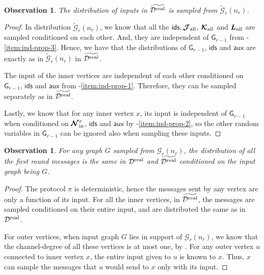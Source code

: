 \documentclass[11pt]{article}
\newtheorem{observation}[lemma]{Observation}
\theoremstyle{definition}
\newcommand{\rv}[1]{\ensuremath{{\mathsf{#1}}}\xspace}
\newcommand{\prot}{\ensuremath{\pi}}
\newcommand{\rNinner}[2]{\ensuremath{\bm{\mathcal{N}}_{\textnormal{in}}^{#1_{#2}}}}
\newcommand{\cD}{\ensuremath{\mathcal{D}}}
\newcommand{\cG}{\ensuremath{\mathcal{G}}}
\newcommand{\cGtil}{\ensuremath{\widetilde{\cG}}}
\newcommand{\cDreal}{\ensuremath{\cD^{\textnormal{real}}}}
\newcommand{\cDrealtil}{\ensuremath{\widetilde{\cDreal}}}
\newcommand{\raux}{\ensuremath{\rv{aux}}}
\newcommand{\rcJall}{\ensuremath{\bm{\mathcal{J}}_{\textnormal{all}}}}
\newcommand{\rcKall}{\ensuremath{\bm{\mathcal{K}}_{\textnormal{all}}}}
\newcommand{\rLall}{\ensuremath{\bm{L}_{\textnormal{all}}}}
\newcommand{\rG}{\ensuremath{\rv{G}}}
\newcommand{\rids}{\ensuremath{\rv{ids}}}
\newcommand{\rmsgall}{\ensuremath{\bm{\mathcal{M}}_{\textnormal{all}}}}
\begin{document}
\begin{observation}\label{obs:cDrealtil-input-same}
The distribution of inputs in $\cDrealtil$ is sampled from $\cGtil_r(n_r)$.
\end{observation}
\begin{proof}
	In distribution $\cGtil_r(n_r)$, we know that all the $\rids, \rcJall$, $\rcKall $ and $\rLall$ are sampled conditioned on each other. And, they are independent of $\rG_{r-1}$ from -\ref{item:ind-prop-3}. Hence, we have that the distributions of $\rG_{r-1}$, $\rids$ and $\raux$ are exactly as in $\cGtil_r(n_r)$ in $\cDrealtil$.
	
	The input of the inner vertices are independent of each other conditioned on $\rG_{r-1}$, $\rids$ and $\raux$ from -\ref{item:ind-prop-1}. Therefore, they can be sampled separately as in $\cDrealtil$.
	
	Lastly, we know that for any inner vertex $x$, its input is independent of $\rG_{r-1}$ when conditioned on $\rNinner{x}{}$, $\rids$ and $\raux$ by -\ref{item:ind-prop-2}, so the other random variables in $\rG_{r-1}$ can be ignored also when sampling these inputs. 
\end{proof}

\begin{observation}\label{obs:cDrealtil-messages}
	For any graph $G$ sampled from $\cG_r(n_r)$, the distribution of all the first round messages is the same in $\cDreal$ and $\cDrealtil$ conditioned on the input graph being $G$.
\end{observation}
\begin{proof}
	The protocol $\prot$ is deterministic, hence the messages sent by any vertex are only a function of its input. For all the inner vertices, in $\cDrealtil$, the messages are sampled conditioned on their entire input, and are distributed the same as in $\cDreal$. 
	
	For outer vertices, when input graph $G$ lies in support of $\cG_r(n_r)$, we know that the channel-degree of all these vertices is at most one, by . For any outer vertex $u$ connected to inner vertex $x$, the entire input given to $u$ is known to $x$. Thus, $x$ can sample the messages that $u$ would send to $x$ only with its input. 
\end{proof}
\end{document}
